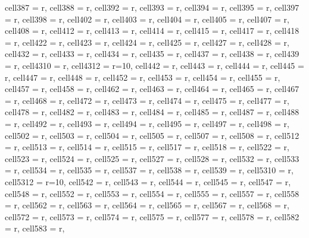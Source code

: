 \begin{longtblr}[
  caption = {Linear model estimating all the considered metrics in every alternative scenario.}
]
{  cell{38}{7} = {r},
  cell{38}{8} = {r},
  cell{39}{2} = {r},
  cell{39}{3} = {r},
  cell{39}{4} = {r},
  cell{39}{5} = {r},
  cell{39}{7} = {r},
  cell{39}{8} = {r},
  cell{40}{2} = {r},
  cell{40}{3} = {r},
  cell{40}{4} = {r},
  cell{40}{5} = {r},
  cell{40}{7} = {r},
  cell{40}{8} = {r},
  cell{41}{2} = {r},
  cell{41}{3} = {r},
  cell{41}{4} = {r},
  cell{41}{5} = {r},
  cell{41}{7} = {r},
  cell{41}{8} = {r},
  cell{42}{2} = {r},
  cell{42}{3} = {r},
  cell{42}{4} = {r},
  cell{42}{5} = {r},
  cell{42}{7} = {r},
  cell{42}{8} = {r},
  cell{43}{2} = {r},
  cell{43}{3} = {r},
  cell{43}{4} = {r},
  cell{43}{5} = {r},
  cell{43}{7} = {r},
  cell{43}{8} = {r},
  cell{43}{9} = {r},
  cell{43}{10} = {r},
  cell{43}{12} = {r=10}{},
  cell{44}{2} = {r},
  cell{44}{3} = {r},
  cell{44}{4} = {r},
  cell{44}{5} = {r},
  cell{44}{7} = {r},
  cell{44}{8} = {r},
  cell{45}{2} = {r},
  cell{45}{3} = {r},
  cell{45}{4} = {r},
  cell{45}{5} = {r},
  cell{45}{7} = {r},
  cell{45}{8} = {r},
  cell{46}{2} = {r},
  cell{46}{3} = {r},
  cell{46}{4} = {r},
  cell{46}{5} = {r},
  cell{46}{7} = {r},
  cell{46}{8} = {r},
  cell{47}{2} = {r},
  cell{47}{3} = {r},
  cell{47}{4} = {r},
  cell{47}{5} = {r},
  cell{47}{7} = {r},
  cell{47}{8} = {r},
  cell{48}{2} = {r},
  cell{48}{3} = {r},
  cell{48}{4} = {r},
  cell{48}{5} = {r},
  cell{48}{7} = {r},
  cell{48}{8} = {r},
  cell{49}{2} = {r},
  cell{49}{3} = {r},
  cell{49}{4} = {r},
  cell{49}{5} = {r},
  cell{49}{7} = {r},
  cell{49}{8} = {r},
  cell{50}{2} = {r},
  cell{50}{3} = {r},
  cell{50}{4} = {r},
  cell{50}{5} = {r},
  cell{50}{7} = {r},
  cell{50}{8} = {r},
  cell{51}{2} = {r},
  cell{51}{3} = {r},
  cell{51}{4} = {r},
  cell{51}{5} = {r},
  cell{51}{7} = {r},
  cell{51}{8} = {r},
  cell{52}{2} = {r},
  cell{52}{3} = {r},
  cell{52}{4} = {r},
  cell{52}{5} = {r},
  cell{52}{7} = {r},
  cell{52}{8} = {r},
  cell{53}{2} = {r},
  cell{53}{3} = {r},
  cell{53}{4} = {r},
  cell{53}{5} = {r},
  cell{53}{7} = {r},
  cell{53}{8} = {r},
  cell{53}{9} = {r},
  cell{53}{10} = {r},
  cell{53}{12} = {r=10}{},
  cell{54}{2} = {r},
  cell{54}{3} = {r},
  cell{54}{4} = {r},
  cell{54}{5} = {r},
  cell{54}{7} = {r},
  cell{54}{8} = {r},
  cell{55}{2} = {r},
  cell{55}{3} = {r},
  cell{55}{4} = {r},
  cell{55}{5} = {r},
  cell{55}{7} = {r},
  cell{55}{8} = {r},
  cell{56}{2} = {r},
  cell{56}{3} = {r},
  cell{56}{4} = {r},
  cell{56}{5} = {r},
  cell{56}{7} = {r},
  cell{56}{8} = {r},
  cell{57}{2} = {r},
  cell{57}{3} = {r},
  cell{57}{4} = {r},
  cell{57}{5} = {r},
  cell{57}{7} = {r},
  cell{57}{8} = {r},
  cell{58}{2} = {r},
  cell{58}{3} = {r},
}
\end{longtblr}
